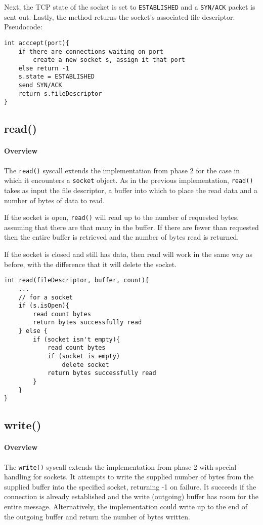 \documentclass[]{article}
\begin{document}
Next, the TCP state of the socket is set to \texttt{ESTABLISHED} and a \texttt{SYN/ACK} packet is sent out. Lastly, the method returns the socket's associated file descriptor.\\

\noindent Pseudocode:

\begin{lstlisting}
int acccept(port){
	if there are connections waiting on port
		create a new socket s, assign it that port
	else return -1
	s.state = ESTABLISHED
	send SYN/ACK
	return s.fileDescriptor
}
\end{lstlisting}

\subsection{read()}
\paragraph{Overview}
The \texttt{read()} syscall extends the implementation from phase 2 for the case in which it encounters a \texttt{socket} object. As in the previous implementation, \texttt{read()} takes as input the file descriptor, a buffer into which to place the read data and a number of bytes of data to read.

If the socket is open, \texttt{read()} will read up to the number of requested bytes, assuming that there are that many in the buffer. If there are fewer than requested then the entire buffer is retrieved and the number of bytes read is returned.

If the socket is closed and still has data, then read will work in the same way as before, with the difference that it will delete the socket. 

\begin{lstlisting}
int read(fileDescriptor, buffer, count){
	...
	// for a socket
	if (s.isOpen){
		read count bytes
		return bytes successfully read
	} else {
		if (socket isn't empty){
			read count bytes
			if (socket is empty)
				delete socket
			return bytes successfully read	
		}	
	}
}
\end{lstlisting}

\subsection{write()}
\paragraph{Overview}
The \texttt{write()} syscall extends the implementation from phase 2 with special handling for sockets. It attempts to write the supplied number of bytes from the supplied buffer into the specified socket, returning -1 on failure. It succeeds if the connection is already established and the write (outgoing) buffer has room for the entire message. Alternatively, the implementation could write up to the end of the outgoing buffer and return the number of bytes written.\\
\end{document}
